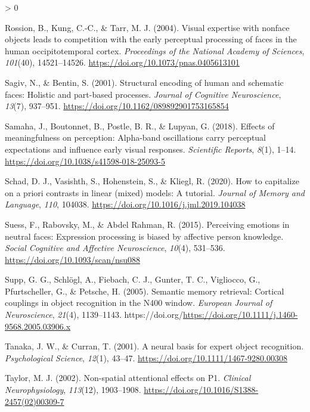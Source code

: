 \documentclass[
  english,
  doc,12pt,twoside,floatsintext]{apa7}
\newlength{\cslhangindent}
\newenvironment{CSLReferences}[2] %
 {%
  \setlength{\parindent}{0pt}
  \ifodd #1 \everypar{\setlength{\hangindent}{\cslhangindent}}\ignorespaces\fi
  \ifnum #2 > 0
  \setlength{\parskip}{#2\baselineskip}
  \fi
 }%
 {}
\begin{document}
\begin{CSLReferences}{1}{0}
\leavevmode\hypertarget{ref-rossion2004}{}%
Rossion, B., Kung, C.-C., \& Tarr, M. J. (2004). Visual expertise with nonface objects leads to competition with the early perceptual processing of faces in the human occipitotemporal cortex. \emph{Proceedings of the National Academy of Sciences}, \emph{101}(40), 14521--14526. \url{https://doi.org/10.1073/pnas.0405613101}

\leavevmode\hypertarget{ref-sagiv2001}{}%
Sagiv, N., \& Bentin, S. (2001). Structural encoding of human and schematic faces: Holistic and part-based processes. \emph{Journal of Cognitive Neuroscience}, \emph{13}(7), 937--951. \url{https://doi.org/10.1162/089892901753165854}

\leavevmode\hypertarget{ref-samaha2018}{}%
Samaha, J., Boutonnet, B., Postle, B. R., \& Lupyan, G. (2018). Effects of meaningfulness on perception: Alpha-band oscillations carry perceptual expectations and influence early visual responses. \emph{Scientific Reports}, \emph{8}(1), 1--14. \url{https://doi.org/10.1038/s41598-018-25093-5}

\leavevmode\hypertarget{ref-schad2020}{}%
Schad, D. J., Vasishth, S., Hohenstein, S., \& Kliegl, R. (2020). How to capitalize on a priori contrasts in linear (mixed) models: A tutorial. \emph{Journal of Memory and Language}, \emph{110}, 104038. \url{https://doi.org/10.1016/j.jml.2019.104038}

\leavevmode\hypertarget{ref-suess2015}{}%
Suess, F., Rabovsky, M., \& Abdel Rahman, R. (2015). Perceiving emotions in neutral faces: Expression processing is biased by affective person knowledge. \emph{Social Cognitive and Affective Neuroscience}, \emph{10}(4), 531--536. \url{https://doi.org/10.1093/scan/nsu088}

\leavevmode\hypertarget{ref-supp2005}{}%
Supp, G. G., Schlögl, A., Fiebach, C. J., Gunter, T. C., Vigliocco, G., Pfurtscheller, G., \& Petsche, H. (2005). Semantic memory retrieval: Cortical couplings in object recognition in the N400 window. \emph{European Journal of Neuroscience}, \emph{21}(4), 1139--1143. https://doi.org/\url{https://doi.org/10.1111/j.1460-9568.2005.03906.x}

\leavevmode\hypertarget{ref-tanaka2001}{}%
Tanaka, J. W., \& Curran, T. (2001). A neural basis for expert object recognition. \emph{Psychological Science}, \emph{12}(1), 43--47. \url{https://doi.org/10.1111/1467-9280.00308}

\leavevmode\hypertarget{ref-taylor2002}{}%
Taylor, M. J. (2002). Non-spatial attentional effects on {P1}. \emph{Clinical Neurophysiology}, \emph{113}(12), 1903--1908. \url{https://doi.org/10.1016/S1388-2457(02)00309-7}


\end{CSLReferences}
\end{document}
